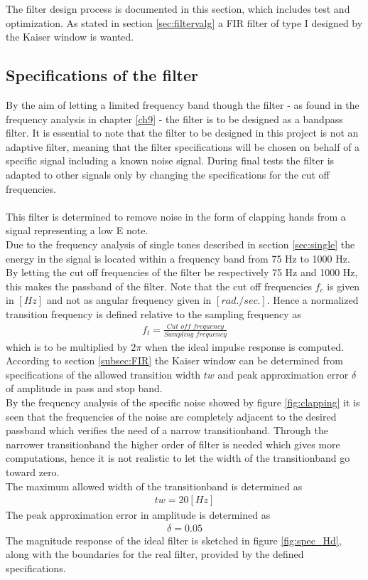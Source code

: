 The filter design process is documented in this section, which includes test and optimization. As stated in section \ref{sec:filtervalg} a FIR filter of type I designed by the Kaiser window is wanted.

\subsection{Specifications of the filter} \label{sec:FIRspec} 
By the aim of letting a limited frequency band though the filter - as found in the frequency analysis in chapter \ref{ch9} - the filter is to be designed as a bandpass filter. It is essential to note that the filter to be designed in this project is not an adaptive filter, meaning that the filter specifications will be chosen on behalf of a specific signal including a known noise signal. During final tests the filter is adapted to other signals only by changing the specifications for the cut off frequencies. \\ \\
This filter is determined to remove noise in the form of clapping hands from a signal representing a low E note. \\
Due to the frequency analysis of single tones described in section \ref{sec:single} the energy in the signal is located within a frequency band from 75 Hz to 1000 Hz.  
By letting the cut off frequencies of the filter be respectively 75 Hz and 1000 Hz, this makes the passband of the filter. 
Note that the cut off frequencies $f_c$ is given in $[Hz]$ and not as angular frequency given in $[rad./sec.]$. Hence a normalized transition frequency is defined relative to the sampling frequency as 
\begin{align}
f_t = \frac{\textit{Cut off frequency}}{\textit{Sampling frequency}}
\end{align}
which is to be multiplied by $2\pi$ when the ideal impulse response is computed. 
According to section \ref{subsec:FIR} the Kaiser window can be determined from specifications of the allowed transition width $tw$ and peak approximation error $\delta$ of amplitude in pass and stop band.\\ 
By the frequency analysis of the specific noise showed by figure \ref{fig:clapping} it is seen that the frequencies of the noise are completely adjacent to the desired passband which verifies the need of a narrow transitionband. Through the narrower transitionband the higher order of filter is needed which gives more computations, hence it is not realistic to let the width of the transitionband go toward zero.  \\  
The maximum allowed width of the transitionband is determined as
\begin{align}
tw = 20 [Hz]
\end{align}
The peak approximation error in amplitude is determined as 
\begin{align}
\delta = 0.05 
\end{align}
The magnitude response of the ideal filter is sketched in figure \ref{fig:spec_Hd}, along with the boundaries for the real filter, provided by the defined specifications.      

